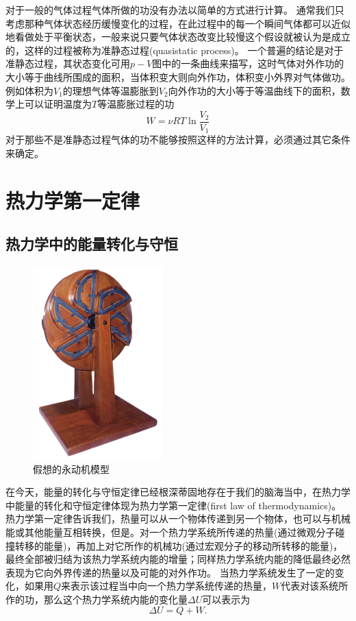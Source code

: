 对于一般的气体过程气体所做的功没有办法以简单的方式进行计算。
通常我们只考虑那种气体状态经历缓慢变化的过程，在此过程中的每一个瞬间气体都可以近似地看做处于平衡状态，一般来说只要气体状态改变比较慢这个假设就被认为是成立的，这样的过程被称为{\heiti 准静态过程}(quasistatic process)。
一个普遍的结论是对于准静态过程，其状态变化可用$p-V$图中的一条曲线来描写，这时气体对外作功的大小等于曲线所围成的面积，当体积变大则向外作功，体积变小外界对气体做功。
例如体积为$V_1$的理想气体等温膨胀到$V_2$向外作功的大小等于等温曲线下的面积，数学上可以证明温度为$T$等温膨胀过程的功
\begin{equation}
W = \nu RT\ln \frac{V_2}{V_1}
\end{equation}
对于那些不是准静态过程气体的功不能够按照这样的方法计算，必须通过其它条件来确定。












\section{热力学第一定律}
\subsection{热力学中的能量转化与守恒}
\begin{figure}
	\includegraphics[width=5cm]{images/thermal-19.pdf} 
	\caption{假想的永动机模型}\label{fig: }
\end{figure}
在今天，能量的转化与守恒定律已经根深蒂固地存在于我们的脑海当中，在热力学中能量的转化和守恒定律体现为{\heiti 热力学第一定律}(first law of thermodynamics)。
热力学第一定律告诉我们，热量可以从一个物体传递到另一个物体，也可以与机械能或其他能量互相转换，但是。对一个热力学系统所传递的热量(通过微观分子碰撞转移的能量)，再加上对它所作的机械功(通过宏观分子的移动所转移的能量)，最终全部被归结为该热力学系统内能的增量；同样热力学系统内能的降低最终必然表现为它向外界传递的热量以及可能的对外作功。
当热力学系统发生了一定的变化，如果用$Q$来表示该过程当中向一个热力学系统传递的热量，$W$代表对该系统所作的功，那么这个热力学系统内能的变化量$\Delta U$可以表示为
\begin{equation}\label{eqn: thermol 热力学第一定律}
\Delta U = Q+W.
\end{equation}


